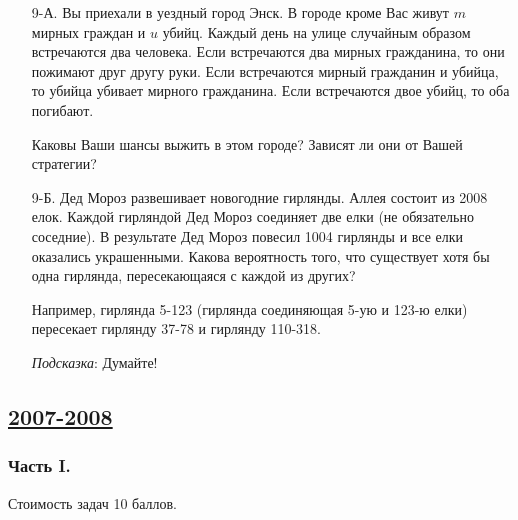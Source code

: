 \begin{enumerate}
\item[9-А.] Вы приехали в уездный город Энск. В городе кроме Вас живут $m$ мирных
граждан и $u$ убийц. Каждый день на улице случайным образом встречаются два человека.
Если встречаются два мирных гражданина, то они пожимают друг другу руки. Если
встречаются мирный гражданин и убийца, то убийца убивает мирного гражданина. Если
встречаются двое убийц, то оба погибают.

Каковы Ваши шансы выжить в этом городе? Зависят ли они от Вашей стратегии?

\item[9-Б.] Дед Мороз развешивает новогодние гирлянды. Аллея состоит из 2008 елок.
Каждой гирляндой Дед Мороз соединяет две елки (не обязательно соседние). В результате
Дед Мороз повесил 1004 гирлянды и все елки оказались украшенными. Какова вероятность
того, что существует хотя бы одна гирлянда, пересекающаяся с каждой из других?

Например, гирлянда 5-123 (гирлянда соединяющая 5-ую и 123-ю елки) пересекает гирлянду
37-78 и гирлянду 110-318.

\emph{Подсказка}: Думайте!
\end{enumerate}




\newpage
\subsection[2007-2008]{\hyperref[sec:sol_kr_01_2007_2008]{2007-2008}}
\label{sec:kr_01_2007_2008}

\subsubsection*{Часть I.}

Стоимость задач 10 баллов.

